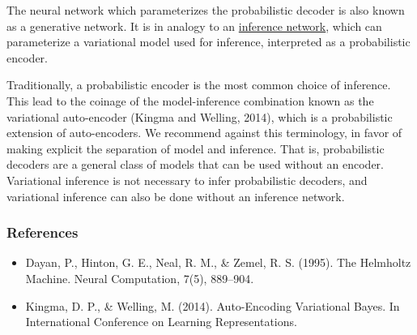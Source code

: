 The neural network which parameterizes the probabilistic decoder is
also known as a generative network. It is in analogy to an
\href{tut_inference_networks}{inference network}, which
can parameterize a variational model used for inference,
interpreted as a probabilistic encoder.

Traditionally, a probabilistic encoder is the most common
choice of inference. This lead to the coinage of the model-inference
combination known as the variational auto-encoder
(Kingma and Welling, 2014), which is a probabilistic extension of
auto-encoders.
We recommend against this terminology,
in favor of making explicit the separation of model and inference.
That is, probabilistic decoders are a general class of
models that can be used without an encoder.
Variational
inference is not necessary to infer probabilistic decoders, and
variational inference can also be done without an inference network.

\subsubsection{References}\label{references}

\begin{itemize}
\item
  Dayan, P., Hinton, G. E., Neal, R. M., & Zemel, R. S. (1995). The Helmholtz Machine. Neural Computation, 7(5), 889–904.
\item
  Kingma, D. P., & Welling, M. (2014). Auto-Encoding Variational Bayes. In International Conference on Learning Representations.
\end{itemize}
